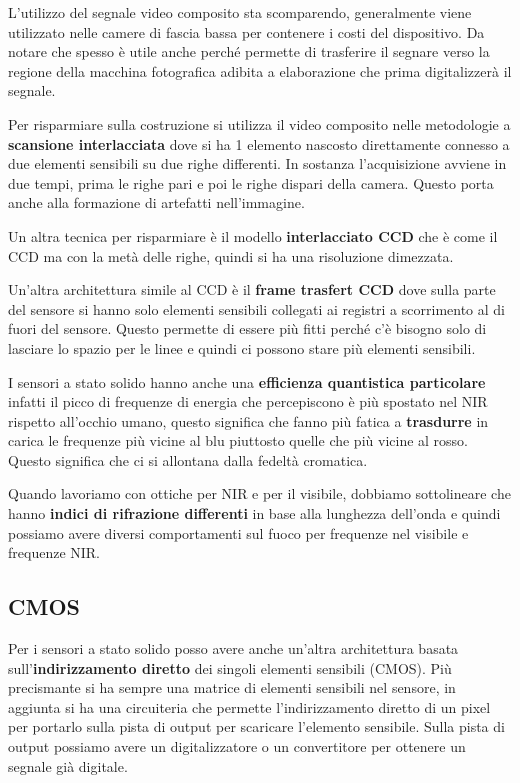 L'utilizzo del segnale video composito sta scomparendo, generalmente viene utilizzato 
nelle camere di fascia bassa per contenere i costi del dispositivo. Da notare che 
spesso è utile anche perché permette di trasferire il segnare verso la regione 
della macchina fotografica adibita a elaborazione che prima digitalizzerà il segnale.

Per risparmiare sulla costruzione si utilizza il video composito nelle metodologie 
a \textbf{scansione interlacciata} dove si ha 1 elemento nascosto direttamente connesso
a due elementi sensibili su due righe differenti. In sostanza l'acquisizione avviene 
in due tempi, prima le righe pari e poi le righe dispari della camera. Questo porta 
anche alla formazione di artefatti nell'immagine.

Un altra tecnica per risparmiare è il modello \textbf{interlacciato CCD} che è come 
il CCD ma con la metà delle righe, quindi si ha una risoluzione dimezzata.

Un'altra architettura simile al CCD è il \textbf{frame trasfert CCD} dove sulla parte 
del sensore si hanno solo elementi sensibili collegati ai registri a scorrimento 
al di fuori del sensore. Questo permette di essere più fitti perché c'è bisogno solo 
di lasciare lo spazio per le linee e quindi ci possono stare più elementi sensibili.

I sensori a stato solido hanno anche una \textbf{efficienza quantistica particolare}
infatti il picco di frequenze di energia che percepiscono è più spostato nel NIR
rispetto all'occhio umano, questo significa che fanno più fatica a \textbf{trasdurre}
in carica le frequenze più vicine al blu piuttosto quelle che più vicine al rosso.
Questo significa che ci si allontana dalla fedeltà cromatica.

Quando lavoriamo con ottiche per NIR e per il visibile, dobbiamo sottolineare 
che hanno \textbf{indici di rifrazione differenti} in base alla lunghezza dell'onda e quindi 
possiamo avere diversi comportamenti sul fuoco per frequenze nel visibile e frequenze NIR.

\subsection{CMOS}
Per i sensori a stato solido posso avere anche un'altra architettura basata sull'\textbf{indirizzamento
diretto} dei singoli elementi sensibili (CMOS). Più precismante si ha sempre una matrice 
di elementi sensibili nel sensore, in aggiunta si ha una circuiteria che permette 
l'indirizzamento diretto di un pixel per portarlo sulla pista di output per scaricare 
l'elemento sensibile. Sulla pista di output possiamo avere un digitalizzatore o 
un convertitore per ottenere un segnale già digitale.

